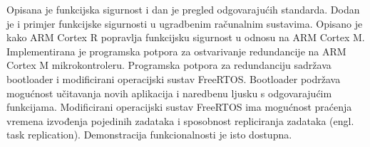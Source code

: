 \documentclass[utf8, diplomski, english, numeric]{fer}
\begin{document}
\begin{sazetak}

Opisana je funkcijska sigurnost i dan je pregled odgovarajućih standarda. Dodan je i primjer funkcijske sigurnosti u ugradbenim računalnim sustavima. Opisano je kako ARM Cortex R popravlja funkcijsku sigurnost u odnosu na ARM Cortex M.
Implementirana je programska potpora za ostvarivanje redundancije na ARM Cortex M mikrokontroleru. Programska potpora za redundanciju sadržava bootloader i modificirani operacijski sustav FreeRTOS. Bootloader podržava mogućnost učitavanja novih aplikacija i naredbenu ljusku s odgovarajućim funkcijama. Modificirani operacijski sustav FreeRTOS ima mogućnost praćenja vremena izvođenja pojedinih zadataka i sposobnost repliciranja zadataka (engl. task replication). Demonstracija funkcionalnosti je isto dostupna.

\end{sazetak}
\end{document}
